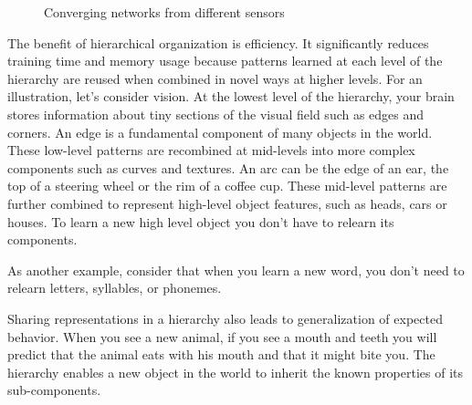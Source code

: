 \documentclass{report}
\begin{document}
\begin{figure}
\caption{Converging networks from different sensors}
\label{figure:multimodal-convergence}
\end{figure}

The benefit of hierarchical organization is efficiency. It
significantly reduces training time and memory usage because patterns
learned at each level of the hierarchy are reused when combined in
novel ways at higher levels. For an illustration, let's consider
vision. At the lowest level of the hierarchy, your brain stores
information about tiny sections of the visual field such as edges and
corners. An edge is a fundamental component of many objects in the
world. These low-level patterns are recombined at mid-levels into more
complex components such as curves and textures. An arc can be the edge
of an ear, the top of a steering wheel or the rim of a coffee
cup. These mid-level patterns are further combined to represent
high-level object features, such as heads, cars or houses. To learn a
new high level object you don't have to relearn its components.

As another example, consider that when you learn a new word, you don't
need to relearn letters, syllables, or phonemes.

Sharing representations in a hierarchy also leads to generalization of
expected behavior. When you see a new animal, if you see a mouth and
teeth you will predict that the animal eats with his mouth and that it
might bite you. The hierarchy enables a new object in the world to
inherit the known properties of its sub-components.
\end{document}
